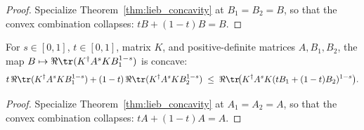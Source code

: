 \begin{proof}\leanok
    Specialize Theorem~\ref{thm:lieb_concavity} at $B_1=B_2=B$, so that
    the convex combination collapses: $tB+(1-t)B=B$.
\end{proof}

\begin{corollary}
    \label{cor:lieb_concavity_in_snd}
    \leanok
    For $s\in[0,1]$, $t\in[0,1]$, matrix $K$, and positive-definite matrices $A,B_1,B_2$,
    the map $B\mapsto\Re\tr(K^\dagger A^s K B_1^{1-s})$ is concave:
    \[
        t\,\Re\tr(K^\dagger A^s K B_1^{1-s})
        +(1-t)\,\Re\tr(K^\dagger A^s K B_2^{1-s})
        \;\le\;
        \Re\tr\!\bigl(K^\dagger A^s K (tB_1+(1-t)B_2)^{1-s}\bigr).
    \]
\end{corollary}

\begin{proof}\leanok
    Specialize Theorem~\ref{thm:lieb_concavity} at $A_1=A_2=A$, so that
    the convex combination collapses: $tA+(1-t)A=A$.
\end{proof}
